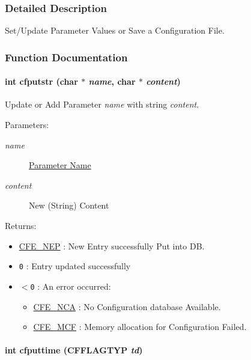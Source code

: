 \subsubsection{Detailed Description}
Set/Update Parameter Values or Save a Configuration File. 

\subsubsection{Function Documentation}
\hypertarget{group__setting__saving_g9553f7a24b080660793a560c2bc8f210}{
\paragraph[{cfputstr}]{\setlength{\rightskip}{0pt plus 5cm}int cfputstr (char $\ast$ {\em name}, \/  char $\ast$ {\em content})}\hfill}
\label{group__setting__saving_g9553f7a24b080660793a560c2bc8f210}


Update or Add Parameter {\em name\/} with string {\em content\/}. 

\begin{Desc}
\item[Parameters:]
\begin{description}
\item[{\em name}]\hyperlink{config_initializer_parameter_name}{Parameter Name} \item[{\em content}]New (String) Content\end{description}
\end{Desc}
\begin{Desc}
\item[Returns:]\begin{itemize}
\item \hyperlink{group__errors_gbb576e88369c2eac1ffd41915292968c}{CFE\_\-NEP} : New Entry successfully Put into DB.  \item {\tt 0} : Entry updated successfully \item {\tt $<$0} : An error occurred:\begin{itemize}
\item \hyperlink{group__errors_gf8cd36471ddcc549668f49238855609d}{CFE\_\-NCA} : No Configuration database Available. \item \hyperlink{group__errors_g127dc37aea6ba5ef8d9dfe5cb9c629eb}{CFE\_\-MCF} : Memory allocation for Configuration Failed.  \end{itemize}
\end{itemize}
\end{Desc}
\hypertarget{group__setting__saving_g6f133f88dc253a6a80d13eed4d123063}{
\paragraph[{cfputtime}]{\setlength{\rightskip}{0pt plus 5cm}int cfputtime ({\bf CFFLAGTYP} {\em td})}\hfill}
\label{group__setting__saving_g6f133f88dc253a6a80d13eed4d123063}


